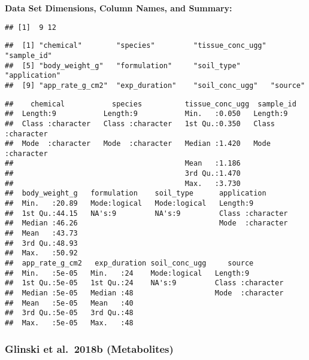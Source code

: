 \documentclass[
]{article}
\begin{document}
\textbf{Data Set Dimensions, Column Names, and Summary:}

\begin{verbatim}
## [1]  9 12
\end{verbatim}

\begin{verbatim}
##  [1] "chemical"        "species"         "tissue_conc_ugg" "sample_id"      
##  [5] "body_weight_g"   "formulation"     "soil_type"       "application"    
##  [9] "app_rate_g_cm2"  "exp_duration"    "soil_conc_ugg"   "source"
\end{verbatim}

\begin{verbatim}
##    chemical           species          tissue_conc_ugg  sample_id        
##  Length:9           Length:9           Min.   :0.050   Length:9          
##  Class :character   Class :character   1st Qu.:0.350   Class :character  
##  Mode  :character   Mode  :character   Median :1.420   Mode  :character  
##                                        Mean   :1.186                     
##                                        3rd Qu.:1.470                     
##                                        Max.   :3.730                     
##  body_weight_g   formulation    soil_type      application       
##  Min.   :20.89   Mode:logical   Mode:logical   Length:9          
##  1st Qu.:44.15   NA's:9         NA's:9         Class :character  
##  Median :46.26                                 Mode  :character  
##  Mean   :43.73                                                   
##  3rd Qu.:48.93                                                   
##  Max.   :50.92                                                   
##  app_rate_g_cm2   exp_duration soil_conc_ugg     source         
##  Min.   :5e-05   Min.   :24    Mode:logical   Length:9          
##  1st Qu.:5e-05   1st Qu.:24    NA's:9         Class :character  
##  Median :5e-05   Median :48                   Mode  :character  
##  Mean   :5e-05   Mean   :40                                     
##  3rd Qu.:5e-05   3rd Qu.:48                                     
##  Max.   :5e-05   Max.   :48
\end{verbatim}

\hypertarget{glinski-et-al.-2018b-metabolites}{%
\subsubsection{Glinski et al.~2018b
(Metabolites)}\label{glinski-et-al.-2018b-metabolites}}
\end{document}

